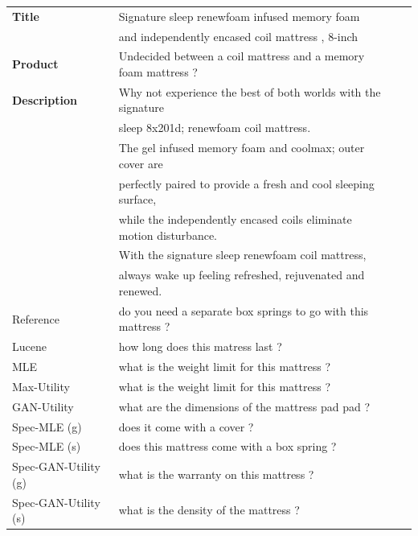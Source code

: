 \documentclass[11pt,a4paper]{article}
\begin{document}
\begin{table}[t]
\centering
\footnotesize
\begin{tabular}{l l c c}
 \toprule
  \textbf{Title} & Signature sleep renewfoam infused memory foam  \\
  & and independently encased coil mattress , 8-inch \\
\midrule
\textbf{Product} &  Undecided between a coil mattress and a memory foam mattress ?\\
\textbf{Description} &  Why not experience the best of both worlds with the signature  \\
 & sleep 8x201d; renewfoam coil mattress. \\
 & The gel infused memory foam and coolmax; outer cover are  \\
 & perfectly paired to provide a fresh and cool sleeping surface, \\
 & while the independently encased coils eliminate motion disturbance. \\
 & With the signature sleep renewfoam coil mattress, \\
 & always wake up feeling refreshed, rejuvenated and renewed.\\
\midrule
Reference & do you need a separate box springs to go with this mattress ?\\
Lucene & how long does this matress last ? \\
MLE & what is the weight limit for this mattress ?\\
Max-Utility & what is the weight limit for this mattress ?  \\
GAN-Utility & what are the dimensions of the mattress pad pad ?\\
Spec-MLE (g) & does it come with a cover ? \\
Spec-MLE (s) & does this mattress come with a box spring ?\\
Spec-GAN-Utility (g) &  what is the warranty on this mattress ?\\
Spec-GAN-Utility (s) & what is the density of the mattress ? \\
\bottomrule


\end{tabular}
\end{table}
\end{document}

